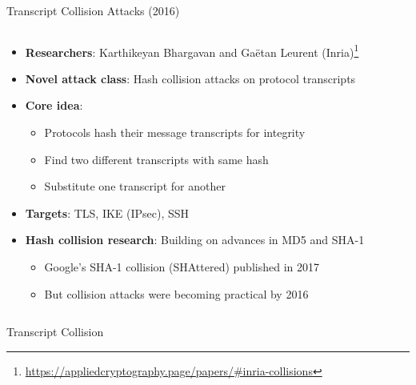 \documentclass[aspectratio=169, lualatex, handout]{beamer}
\begin{document}
\begin{frame}{Transcript Collision Attacks (2016)}
	\begin{columns}[c]
		\begin{column}{1\textwidth}
			\begin{itemize}[<+->]
				\item \textbf{Researchers}: Karthikeyan Bhargavan and Gaëtan Leurent (Inria)\footnote{\url{https://appliedcryptography.page/papers/\#inria-collisions}}
				\item \textbf{Novel attack class}: Hash collision attacks on protocol transcripts
				\item \textbf{Core idea}:
				      \begin{itemize}
					      \item Protocols hash their message transcripts for integrity
					      \item Find two different transcripts with same hash
					      \item Substitute one transcript for another
				      \end{itemize}
				\item \textbf{Targets}: TLS, IKE (IPsec), SSH
				\item \textbf{Hash collision research}: Building on advances in MD5 and SHA-1
				      \begin{itemize}
					      \item Google's SHA-1 collision (SHAttered) published in 2017
					      \item But collision attacks were becoming practical by 2016
				      \end{itemize}
			\end{itemize}
		\end{column}
	\end{columns}
\end{frame}

\begin{frame}{Transcript Collision}
\end{frame}
\end{document}
